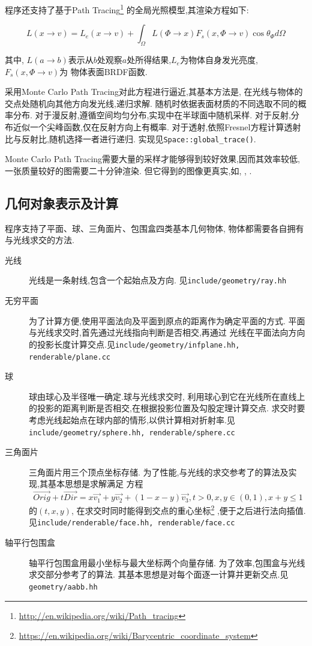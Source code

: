 程序还支持了基于Path Tracing\footnote{\url{http://en.wikipedia.org/wiki/Path_tracing}}
的全局光照模型,其渲染方程如下:

\[ L(x \rightarrow v) = L_e(x \rightarrow v)
+ \int_{\Omega}L(\Phi \rightarrow x) F_s(x, \Phi \rightarrow v)\cos \theta_{\Phi} d \Omega\]

其中, $ L(a\rightarrow b)$表示从$ b$处观察$ a$处所得结果,$ L_e$为物体自身发光亮度,$ F_s(x, \Phi \rightarrow v)$为
物体表面BRDF函数.

采用Monte Carlo Path Tracing\cite{montecarlo}对此方程进行逼近,其基本方法是,
在光线与物体的交点处随机向其他方向发光线,递归求解. 随机时依据表面材质的不同选取不同的概率分布.
对于漫反射,遵循空间均匀分布,实现中在半球面中随机采样.
对于反射,分布近似一个尖峰函数,仅在反射方向上有概率.
对于透射,依照Fresnel方程\cite{fresnel}计算透射比与反射比,随机选择一者进行递归.
实现见\verb|Space::global_trace()|.

Monte Carlo Path Tracing需要大量的采样才能够得到较好效果,因而其效率较低,
一张质量较好的图需要二十分钟渲染. 但它得到的图像更真实,如, , .

\subsection{几何对象表示及计算}
程序支持了平面、球、三角面片、包围盒四类基本几何物体,
物体都需要各自拥有与光线求交的方法.

\begin{description}
  \item[光线]光线是一条射线,包含一个起始点及方向. 见\verb|include/geometry/ray.hh|
  \item[无穷平面]
    为了计算方便,使用平面法向及平面到原点的距离作为确定平面的方式.
    平面与光线求交时,首先通过光线指向判断是否相交,再通过
    光线在平面法向方向的投影长度计算交点.见\verb|include/geometry/infplane.hh, renderable/plane.cc|

  \item[球]球由球心及半径唯一确定.球与光线求交时,
    利用球心到它在光线所在直线上的投影的距离判断是否相交,在根据投影位置及勾股定理计算交点.
    求交时要考虑光线起始点在球内部的情形,以供计算相对折射率.见\verb|include/geometry/sphere.hh, renderable/sphere.cc|

  \item[三角面片]三角面片用三个顶点坐标存储.
    为了性能,与光线的求交参考了\cite{triangle, triangle_code}的算法及实现,其基本思想是求解满足
    方程
    \[  \overrightarrow{Orig} + t  \overrightarrow{Dir} = x \overrightarrow{v_1} + y  \overrightarrow{v_2} + (1 - x -
      y)\overrightarrow{v_3}, t > 0, x, y \in (0, 1), x + y \le 1\]
    的$ (t, x, y)$, 在求交时同时能得到交点的重心坐标\footnote{\url{https://en.wikipedia.org/wiki/Barycentric\_coordinate\_system}}
    ,便于之后进行法向插值.见\verb|include/renderable/face.hh, renderable/face.cc|

  \item[轴平行包围盒]
    轴平行包围盒用最小坐标与最大坐标两个向量存储.
    为了效率,包围盒与光线求交部分参考了\cite{aabb}的算法.
    其基本思想是对每个面逐一计算并更新交点.见\verb|geometry/aabb.hh|
\end{description}


